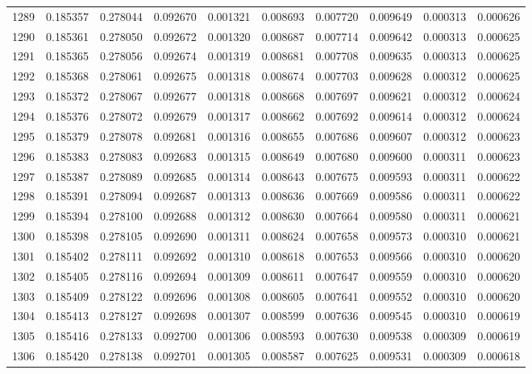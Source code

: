 \begin{tabular}{lrrrrrrrrr}
1289 & 0.185357 & 0.278044 & 0.092670 & 0.001321 & 0.008693 & 0.007720 & 0.009649 & 0.000313 & 0.000626 \\
1290 & 0.185361 & 0.278050 & 0.092672 & 0.001320 & 0.008687 & 0.007714 & 0.009642 & 0.000313 & 0.000625 \\
1291 & 0.185365 & 0.278056 & 0.092674 & 0.001319 & 0.008681 & 0.007708 & 0.009635 & 0.000313 & 0.000625 \\
1292 & 0.185368 & 0.278061 & 0.092675 & 0.001318 & 0.008674 & 0.007703 & 0.009628 & 0.000312 & 0.000625 \\
1293 & 0.185372 & 0.278067 & 0.092677 & 0.001318 & 0.008668 & 0.007697 & 0.009621 & 0.000312 & 0.000624 \\
1294 & 0.185376 & 0.278072 & 0.092679 & 0.001317 & 0.008662 & 0.007692 & 0.009614 & 0.000312 & 0.000624 \\
1295 & 0.185379 & 0.278078 & 0.092681 & 0.001316 & 0.008655 & 0.007686 & 0.009607 & 0.000312 & 0.000623 \\
1296 & 0.185383 & 0.278083 & 0.092683 & 0.001315 & 0.008649 & 0.007680 & 0.009600 & 0.000311 & 0.000623 \\
1297 & 0.185387 & 0.278089 & 0.092685 & 0.001314 & 0.008643 & 0.007675 & 0.009593 & 0.000311 & 0.000622 \\
1298 & 0.185391 & 0.278094 & 0.092687 & 0.001313 & 0.008636 & 0.007669 & 0.009586 & 0.000311 & 0.000622 \\
1299 & 0.185394 & 0.278100 & 0.092688 & 0.001312 & 0.008630 & 0.007664 & 0.009580 & 0.000311 & 0.000621 \\
1300 & 0.185398 & 0.278105 & 0.092690 & 0.001311 & 0.008624 & 0.007658 & 0.009573 & 0.000310 & 0.000621 \\
1301 & 0.185402 & 0.278111 & 0.092692 & 0.001310 & 0.008618 & 0.007653 & 0.009566 & 0.000310 & 0.000620 \\
1302 & 0.185405 & 0.278116 & 0.092694 & 0.001309 & 0.008611 & 0.007647 & 0.009559 & 0.000310 & 0.000620 \\
1303 & 0.185409 & 0.278122 & 0.092696 & 0.001308 & 0.008605 & 0.007641 & 0.009552 & 0.000310 & 0.000620 \\
1304 & 0.185413 & 0.278127 & 0.092698 & 0.001307 & 0.008599 & 0.007636 & 0.009545 & 0.000310 & 0.000619 \\
1305 & 0.185416 & 0.278133 & 0.092700 & 0.001306 & 0.008593 & 0.007630 & 0.009538 & 0.000309 & 0.000619 \\
1306 & 0.185420 & 0.278138 & 0.092701 & 0.001305 & 0.008587 & 0.007625 & 0.009531 & 0.000309 & 0.000618 \\

\end{tabular}

